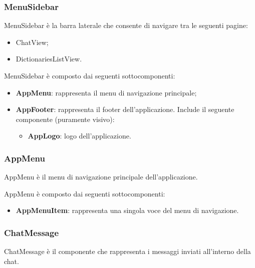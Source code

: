\subsubsection{MenuSidebar}

\par MenuSidebar è la barra laterale che consente di navigare tra le seguenti pagine:
\begin{itemize}
  \item ChatView;
  \item DictionariesListView.
\end{itemize}

\par MenuSidebar è composto dai seguenti sottocomponenti:
\begin{itemize}
  \item \textbf{AppMenu}: rappresenta il menu di navigazione principale;
  \item \textbf{AppFooter}: rappresenta il footer dell'applicazione. Include il seguente componente (puramente visivo):
  \begin{itemize}
    \item \textbf{AppLogo}: logo dell'applicazione.
  \end{itemize}
\end{itemize}

\subsubsection{AppMenu}

\par AppMenu è il menu di navigazione principale dell'applicazione.

\par AppMenu è composto dai seguenti sottocomponenti:
\begin{itemize}
  \item \textbf{AppMenuItem}: rappresenta una singola voce del menu di navigazione.
\end{itemize}

\subsubsection{ChatMessage}

\par ChatMessage è il componente che rappresenta i messaggi inviati all'interno della chat.


